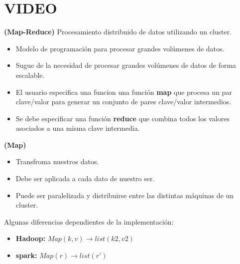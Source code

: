 \documentclass[../main.tex]{subfiles}
\begin{document}
\section{VIDEO}
    \begin{definition} \textbf{(Map-Reduce)}
        Procesamiento distribuido de datos utilizando un cluster.
        \begin{itemize}
            \item Modelo de programación para procesar grandes volúmenes de datos.
            \item Sugue de la necesidad de procesar grandes volúmenes de datos de forma escalable.
        \end{itemize}

        \begin{itemize}
            \item El usuario especifica una funcion una función \textbf{map} que procesa un par clave/valor para generar un conjunto de pares clave/valor intermedios.
            \item Se debe especificar una función \textbf{reduce} que combina todos los valores asociados a una misma clave intermedia.
        \end{itemize}
    \end{definition}

    \begin{definition} \textbf{(Map)}
        \begin{itemize}
            \item Transfroma nuestros datos.
            \item Debe ser aplicada a cada dato de nuestro ser.
            \item Puede ser paralelizada y distribuirse entre las distintas máquinas de un cluster.
        \end{itemize}
        
        Algunas diferencias dependientes de la implementación:
        \begin{itemize}
            \item \textbf{Hadoop:} $Map(k,v) \rightarrow list(k2,v2)$
            \item \textbf{spark:} $Map(r) \rightarrow list(r')$
        \end{itemize}
    \end{definition}
\end{document}
